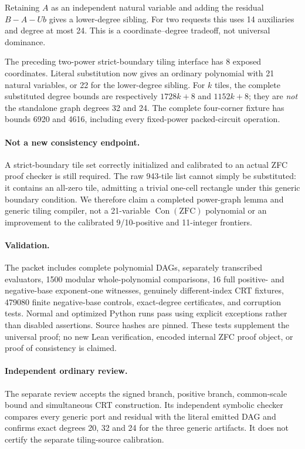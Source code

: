 Retaining $A$ as an independent natural variable and adding the residual
$B-A-Ub$ gives a lower-degree sibling. For two requests this uses 14
auxiliaries and degree at most 24. This is a coordinate--degree tradeoff,
not universal dominance.

The preceding two-power strict-boundary tiling interface has 8 exposed
coordinates. Literal substitution now gives an ordinary polynomial with
21 natural variables, or 22 for the lower-degree sibling. For $k$ tiles,
the complete substituted degree bounds are respectively $1728k+8$ and
$1152k+8$; they are \emph{not} the standalone graph degrees 32 and 24.
The complete four-corner fixture has bounds 6920 and 4616, including every
fixed-power packed-circuit operation.

\paragraph{Not a new consistency endpoint.}
A strict-boundary tile set correctly initialized and calibrated to an
actual ZFC proof checker is still required. The raw 943-tile list cannot
simply be substituted: it contains an all-zero tile, admitting a trivial
one-cell rectangle under this generic boundary condition. We therefore
claim a completed power-graph lemma and generic tiling compiler, not a
21-variable $\operatorname{Con}(\mathrm{ZFC})$ polynomial or an improvement
to the calibrated 9/10-positive and 11-integer frontiers.

\paragraph{Validation.}
The packet includes complete polynomial DAGs, separately transcribed
evaluators, 1500 modular whole-polynomial comparisons, 16 full positive- and
negative-base exponent-one witnesses, genuinely different-index CRT
fixtures, 479080 finite negative-base controls, exact-degree certificates,
and corruption tests. Normal and optimized Python runs pass using explicit
exceptions rather than disabled assertions. Source hashes are pinned.
These tests supplement the universal proof; no new Lean verification,
encoded internal ZFC proof object, or proof of consistency is claimed.


\paragraph{Independent ordinary review.}
The separate review accepts the signed branch, positive branch, common-scale
bound and simultaneous CRT construction. Its independent symbolic checker
compares every generic port and residual with the literal emitted DAG and
confirms exact degrees 20, 32 and 24 for the three generic artifacts. It
does not certify the separate tiling-source calibration.


